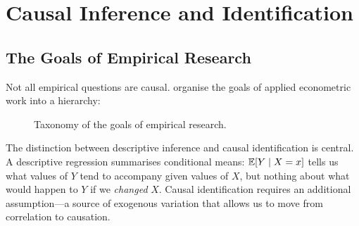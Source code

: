 
\chapter{Causal Inference and Identification}
\label{chap_Causal}

\section{The Goals of Empirical Research}
\label{sec_Goals}

Not all empirical questions are causal. \citet{Angrist2009a} organise the
goals of applied econometric work into a hierarchy:

\begin{figure}[htp]
\centering
{}
\caption{Taxonomy of the goals of empirical research.}
\label{fig_EmpiricalGoals}
\end{figure}

The distinction between descriptive inference and causal identification is
central. A descriptive regression summarises conditional means:
$\mathbb{E}[Y\mid X=x]$ tells us what values of $Y$ tend to accompany given values
of $X$, but nothing about what would happen to $Y$ if we \emph{changed} $X$.
Causal identification requires an additional assumption---a source of
exogenous variation that allows us to move from correlation to causation.


